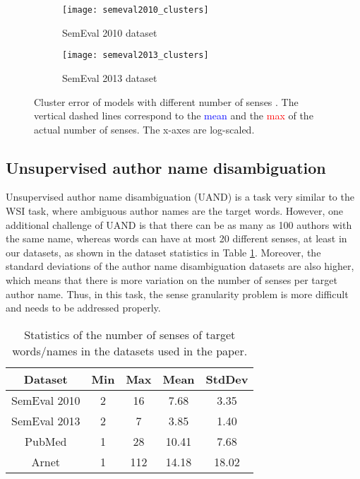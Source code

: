 \documentclass[letterpaper]{article} \usepackage{aaai19}
\begin{document}
\begin{figure}[!t]
	\centering
	\begin{subfigure}{0.45\textwidth}
	    \centering
		\texttt{[image: semeval2010\_clusters]}
		\caption{SemEval 2010 dataset}
	\end{subfigure}
	\begin{subfigure}{0.45\textwidth}
	    \centering
		\texttt{[image: semeval2013\_clusters]}
		\caption{SemEval 2013 dataset}
	\end{subfigure}
	\caption{Cluster error of models with different number of senses . The vertical dashed lines correspond to the \textcolor{blue}{mean} and the \textcolor{red}{max} of the actual number of senses. The x-axes are log-scaled.}
	\label{fig:clusters}
\end{figure}

\subsection{Unsupervised author name disambiguation}

Unsupervised author name disambiguation (UAND) is a task very similar to the WSI task, where ambiguous author names are the target words. However, one additional challenge of UAND is that there can be as many as 100 authors with the same name, whereas words can have at most 20 different senses, at least in our datasets, as shown in the dataset statistics in Table \ref{tab:stat}. Moreover, the standard deviations of the author name disambiguation datasets are also higher, which means that there is more variation on the number of senses per target author name. Thus, in this task, the sense granularity problem is more difficult and needs to be addressed properly.

\begin{table}[t]
    \centering
    \begin{tabular}{|c|cccc|}
        \hline
        Dataset & Min & Max & Mean & StdDev \\
        \hline
        SemEval 2010 & 2 & 16 & 7.68 & 3.35 \\ \hline
        SemEval 2013 & 2 & 7 & 3.85 & 1.40 \\ \hline
        PubMed & 1 & 28 & 10.41 & 7.68 \\ \hline
        Arnet & 1 & 112 & 14.18 & 18.02 \\
        \hline
    \end{tabular}
    \caption{Statistics of the number of senses of target words/names in the datasets used in the paper.}
    \label{tab:stat}
\end{table}
\end{document}
